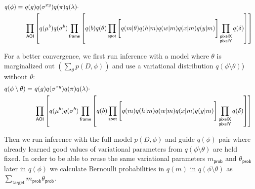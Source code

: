 \begin{equation}
\begin{aligned}
    q(\phi) =~&q(g) q(\sigma^{xy}) q(\pi) q(\lambda) \cdot \\
    &\prod_{\mathsf{AOI}} \left[ q(\mu^b) q(\sigma^b) \prod_{\mathsf{frame}} \left[ q(b) q(\theta) \prod_{\mathsf{spot}} \left[ \vphantom{\prod_{F}} q(m | \theta) q(h | m) q(w | m) q(x | m) q(y | m) \right] \prod_{\substack{\mathsf{pixelX} \\ \mathsf{pixelY}}} q(\delta) \right] \right]
\end{aligned}
\end{equation}



For a better convergence, we first run inference with a model  where $\theta$ is marginalized out $\left( \sum_\theta p(D, \phi) \right)$ and use a variational distribution $q(\phi \setminus \theta)$) without $\theta$:
%
\begin{equation}
\begin{aligned}
    q(\phi \setminus \theta) =~&q(g) q(\sigma^{xy}) q(\pi) q(\lambda) \cdot \\
    &\prod_{\mathsf{AOI}} \left[ q(\mu^b) q(\sigma^b) \prod_{\mathsf{frame}} \left[ \vphantom{\prod_{F}} q(b) \prod_{\mathsf{spot}} \left[ \vphantom{\prod_{F}} q(m) q(h | m) q(w | m) q(x | m) q(y | m) \right] \prod_{\substack{\mathsf{pixelX} \\ \mathsf{pixelY}}} q(\delta) \right] \right]
\end{aligned}
\end{equation}

Then we run inference with the full model $p(D, \phi)$ and guide $q(\phi)$ pair where already learned good values of variational parameters from $q(\phi \setminus \theta)$ are held fixed. In order to be able to reuse the same variational parameters $m_\mathsf{prob}$ and $\theta_\mathsf{prob}$ later in $q(\phi)$ we calculate Bernoulli probabilities in $q(m)$ in $q(\phi \setminus \theta)$ as $\sum_\mathsf{target} m_\mathsf{prob} \theta_\mathsf{prob}$.



